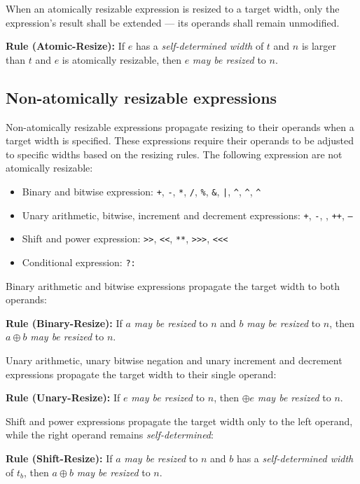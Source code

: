 \documentclass{article}
\newcommand{\tild}{\raisebox{-.7ex}{\textasciitilde{}}}
\newcommand{\sds}{\emph{self-determined width}}
\newcommand{\mbr}{\emph{may be resized}}
\newenvironment{typingrule}[1]%
{\par\noindent\textbf{Rule (#1):} }%
{\par}
\newcommand{\binOp}{\texttt{+}, \texttt{-}, \texttt{*}, \texttt{/}, \texttt{\%},
\texttt{\&}, \texttt{|}, \texttt{\^{}}, \texttt{\^{}\tild},
\texttt{\tild\^{}}}
\newcommand{\unOp}{\texttt{+}, \texttt{-}, \texttt{\tild}, \texttt{++},
  \texttt{--}}
\newcommand{\shiftOp}{\texttt{>>}, \texttt{<}\texttt{<}, \texttt{**},
  \texttt{>>>}, \texttt{<}\texttt{<}\texttt{<}}
\begin{document}
When an atomically resizable expression is resized to a
target width, only the expression's result shall be extended --- its operands
shall remain unmodified.

\begin{typingrule}{Atomic-Resize}
  If $e$ has a \sds{} of $t$ and $n$ is larger than $t$
  and $e$ is atomically resizable, then $e$ \mbr{} to $n$.
\end{typingrule}

\subsection{Non-atomically resizable expressions}%

Non-atomically resizable expressions propagate resizing to their operands when
a target width is specified. These expressions require their operands to be
adjusted to specific widths based on the resizing rules. The following expression
are not atomically resizable:

\begin{itemize}
  \item Binary and bitwise expression: \binOp{}
  \item Unary arithmetic, bitwise, increment and decrement expressions:
    \unOp{}
  \item Shift and power expression: \shiftOp{}
  \item Conditional expression: \texttt{?:}
\end{itemize}

Binary arithmetic and bitwise expressions propagate the target width to both
operands:

\begin{typingrule}{Binary-Resize}
  If $a$ \mbr{} to $n$ and $b$ \mbr{} to $n$, then $a \oplus b$ \mbr{} to $n$.
\end{typingrule}

Unary arithmetic, unary bitwise negation and unary increment and decrement
expressions propagate the target width to their single operand:

\begin{typingrule}{Unary-Resize}
  If $e$ \mbr{} to $n$, then $\oplus e$ \mbr{} to $n$.
\end{typingrule}

Shift and power expressions propagate the target width only to the left operand,
while the right operand remains \emph{self-determined}:

\begin{typingrule}{Shift-Resize}
  If $a$ \mbr{} to $n$ and $b$ has a \sds{} of $t_{b}$, then
  $a \oplus b$ \mbr{} to $n$.
\end{typingrule}
\end{document}
